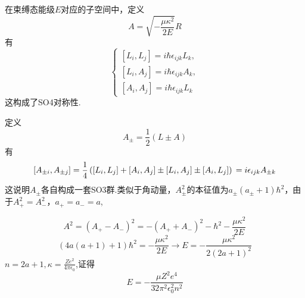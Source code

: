 在束缚态能级$E$对应的子空间中，定义
$$
A = \sqrt{-\frac{\mu\kappa^2}{2E}}R
$$
有
$$
\begin{cases}
[L_i, L_j] = i\hbar \epsilon_{ijk}L_k,\\
[L_i, A_j] = i\hbar \epsilon_{ijk}A_k,\\
[A_i, A_j] = i\hbar \epsilon_{ijk}L_k
\end{cases}
$$
这构成了SO4对称性.

定义
$$
A_{\pm} = \frac{1}{2}\left( L \pm A \right)
$$
有
$$
[A_{\pm i}, A_{\pm j}]\\ 
= \frac{1}{4} \left([L_i, L_j] + [A_i, A_j] \pm [L_i, A_j] \pm [A_i, L_j] \right)\\
= i\epsilon_{ijk} A_{\pm k} 
$$
这说明$A_{\pm}$各自构成一套SO3群.类似于角动量，$A_{\pm}^2$的本征值为$a_{\pm}(a_{\pm}+1)\hbar^2$，由于$A_{+}^2 = A_{-}^2$，$a_+ = a_- = a$,

$$
A^2 = (A_{+} - A_{-})^2 = - (A_{+} + A_{-})^2 - \hbar^2 - \frac{\mu\kappa^2}{2E}
$$
$$
(4 a(a+1) + 1) \hbar^2 = -\frac{\mu\kappa^2}{2E}\rightarrow E = -\frac{\mu\kappa^2}{2(2a+1)^2}
$$
$n = 2a+1,\kappa = \frac{Ze^2}{4\pi\epsilon_0}$,证得
$$
E = - \frac{\mu Z^2 e^4}{32\pi^2\epsilon_0^2n^2}
$$
